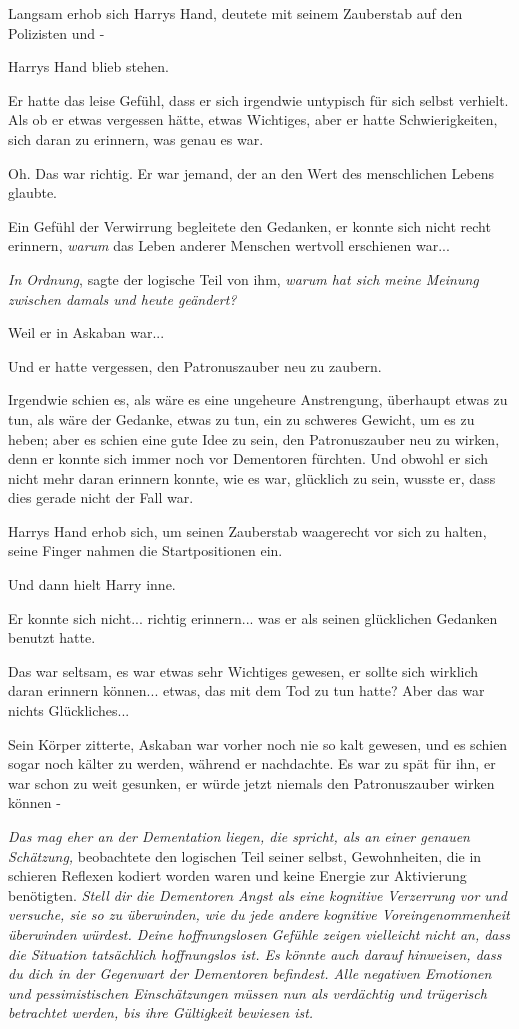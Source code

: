 {Langsam erhob sich Harrys Hand, deutete mit seinem Zauberstab auf den Polizisten und -

Harrys Hand blieb stehen.

Er hatte das leise Gefühl, dass er sich irgendwie untypisch für sich selbst verhielt. Als ob er etwas vergessen hätte, etwas Wichtiges, aber er hatte Schwierigkeiten, sich daran zu erinnern, was genau es war.

Oh. Das war richtig. Er war jemand, der an den Wert des menschlichen Lebens glaubte.

Ein Gefühl der Verwirrung begleitete den Gedanken, er konnte sich nicht recht erinnern, \emph{warum} das Leben anderer Menschen wertvoll erschienen war...

\emph{In Ordnung}, sagte der logische Teil von ihm, \emph{warum hat sich meine Meinung zwischen damals und heute geändert?}

Weil er in Askaban war...

Und er hatte vergessen, den Patronuszauber neu zu zaubern.

Irgendwie schien es, als wäre es eine ungeheure Anstrengung, überhaupt etwas zu tun, als wäre der Gedanke, etwas zu tun, ein zu schweres Gewicht, um es zu heben; aber es schien eine gute Idee zu sein, den Patronuszauber neu zu wirken, denn er konnte sich immer noch vor Dementoren fürchten. Und obwohl er sich nicht mehr daran erinnern konnte, wie es war, glücklich zu sein, wusste er, dass dies gerade nicht der Fall war.

Harrys Hand erhob sich, um seinen Zauberstab waagerecht vor sich zu halten, seine Finger nahmen die Startpositionen ein.

Und dann hielt Harry inne.

Er konnte sich nicht... richtig erinnern... was er als seinen glücklichen Gedanken benutzt hatte.

Das war seltsam, es war etwas sehr Wichtiges gewesen, er sollte sich wirklich daran erinnern können... etwas, das mit dem Tod zu tun hatte? Aber das war nichts Glückliches...

Sein Körper zitterte, Askaban war vorher noch nie so kalt gewesen, und es schien sogar noch kälter zu werden, während er nachdachte. Es war zu spät für ihn, er war schon zu weit gesunken, er würde jetzt niemals den Patronuszauber wirken können -

\emph{Das mag eher an der Dementation liegen, die spricht, als an einer genauen Schätzung,} beobachtete den logischen Teil seiner selbst, Gewohnheiten, die in schieren Reflexen kodiert worden waren und keine Energie zur Aktivierung benötigten. \emph{Stell dir die Dementoren Angst als eine kognitive Verzerrung vor und versuche, sie so zu überwinden, wie du jede andere kognitive Voreingenommenheit überwinden würdest. Deine hoffnungslosen Gefühle zeigen vielleicht nicht an, dass die Situation tatsächlich hoffnungslos ist. Es könnte auch darauf hinweisen, dass du dich in der Gegenwart der Dementoren befindest. Alle negativen Emotionen und pessimistischen Einschätzungen müssen nun als verdächtig und trügerisch betrachtet werden, bis ihre Gültigkeit bewiesen ist.}

}
